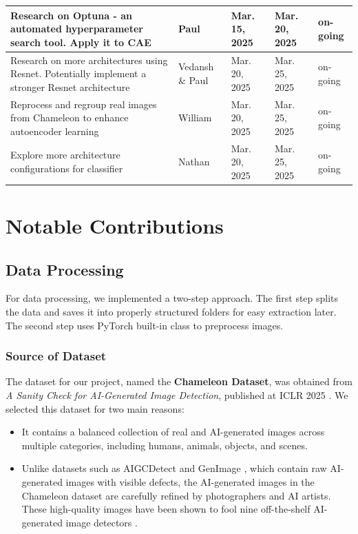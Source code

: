 \documentclass{article} %
\begin{document}
\begin{table}[t]
\begin{center}
\begin{tabular}{|>{\raggedright\arraybackslash}p{4cm}|>{\raggedright\arraybackslash}p{2.5cm}|>{\raggedright\arraybackslash}p{2cm}|>{\raggedright\arraybackslash}p{2cm}|>{\raggedright\arraybackslash}p{1.5cm}|}
    \hline
    Research on Optuna - an automated hyperparameter search tool. Apply it to CAE & Paul & Mar. 15, 2025 & Mar. 20, 2025 & on-going \\
    \hline
    Research on more architectures using Resnet. Potentially implement a stronger Resnet architecture & Vedansh \& Paul & Mar. 20, 2025 & Mar. 25, 2025 & on-going \\
    \hline
    Reprocess and regroup real images from Chameleon to enhance autoencoder learning & William & Mar. 20, 2025 & Mar. 25, 2025 & on-going \\
    \hline
    Explore more architecture configurations for classifier & Nathan & Mar. 20, 2025 & Mar. 25, 2025 & on-going \\
    \hline
    \end{tabular}
    \end{center}
    \end{table}
    

    
\section{Notable Contributions}
\subsection{Data Processing}

For data processing, we implemented a two-step approach. The first step splits the data and saves it into properly structured folders for easy extraction later. The second step uses PyTorch built-in class to preprocess images. 
\subsubsection{Source of Dataset}
The dataset for our project, named the \textbf{Chameleon Dataset}, was obtained from \emph{A Sanity Check for AI-Generated Image Detection}, published at ICLR 2025 \citep{yan2024sanity}. We selected this dataset for two main reasons:

\begin{itemize}
    \item It contains a balanced collection of real and AI-generated images across multiple categories, including humans, animals, objects, and scenes.
    \item Unlike datasets such as AIGCDetect \citep{rptc} and GenImage \citep{zhu2023gendet}, which contain raw AI-generated images with visible defects, the AI-generated images in the Chameleon dataset are carefully refined by photographers and AI artists. These high-quality images have been shown to fool nine off-the-shelf AI-generated image detectors \citep{yan2024sanity}.
\end{itemize}
\end{document}
